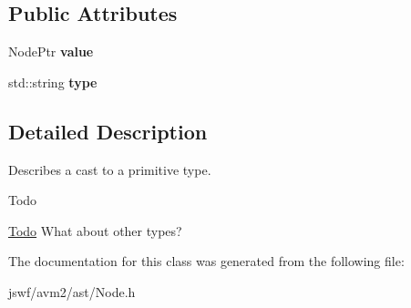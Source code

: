 \subsection*{Public Attributes}
\begin{DoxyCompactItemize}
\item 
\hypertarget{classjswf_1_1avm2_1_1ast_1_1_primitive_cast_node_a6bf1338214639c192aca59097d2858ad}{Node\+Ptr {\bfseries value}}\label{classjswf_1_1avm2_1_1ast_1_1_primitive_cast_node_a6bf1338214639c192aca59097d2858ad}

\item 
\hypertarget{classjswf_1_1avm2_1_1ast_1_1_primitive_cast_node_a4c8e0ad514fcc72f5c50415dfd21a626}{std\+::string {\bfseries type}}\label{classjswf_1_1avm2_1_1ast_1_1_primitive_cast_node_a4c8e0ad514fcc72f5c50415dfd21a626}

\end{DoxyCompactItemize}


\subsection{Detailed Description}
Describes a cast to a primitive type. 

\begin{DoxyRefDesc}{Todo}
\item[\hyperlink{todo__todo000003}{Todo}]What about other types? \end{DoxyRefDesc}


The documentation for this class was generated from the following file\+:\begin{DoxyCompactItemize}
\item 
jswf/avm2/ast/Node.\+h\end{DoxyCompactItemize}
